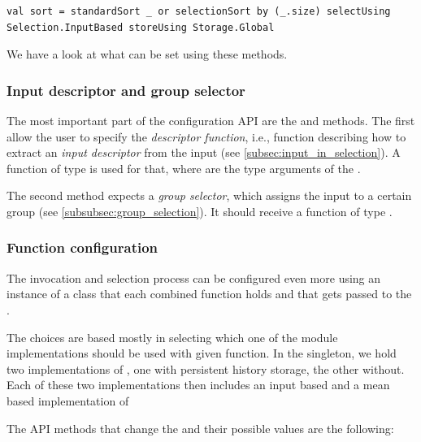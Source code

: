\lstset{style=Scala}
\begin{lstlisting}
val sort = standardSort _ or selectionSort by (_.size) selectUsing Selection.InputBased storeUsing Storage.Global
\end{lstlisting}

We have a look at what can be set using these methods.

\subsubsection{Input descriptor and group selector}

The most important part of the configuration API are the  and  methods. The first allow the user to specify the \textit{descriptor function}, i.e., function describing how to extract an \textit{input descriptor} from the input (see \ref{subsec:input_in_selection}). A function of type  is used for that, where  are the type arguments of the . 

The second method expects a \textit{group selector}, which assigns the input to a certain group (see \ref{subsubsec:group_selection}). It should receive a function of type .

\subsubsection{Function configuration}

The invocation and selection process can be configured even more using an instance of a  class that each combined function holds and that gets passed to the . 

The choices are based mostly in selecting which one of the module implementations should be used with given function. In the  singleton, we hold two implementations of , one with persistent history storage, the other without. Each of these two implementations then includes an input based and a mean based implementation of 

The API methods that change the  and their possible values are the following:

